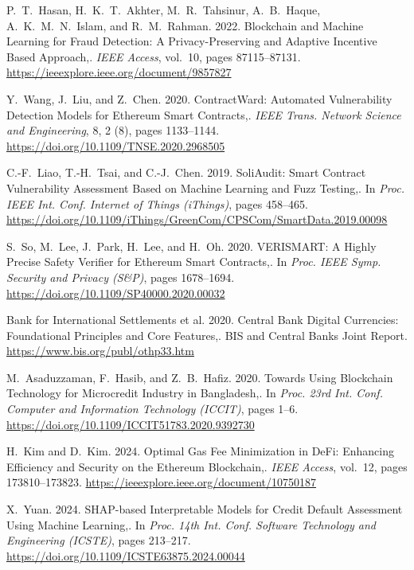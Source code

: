 {\begin{enumerate}[label={[\arabic*]}]
\item P.~T.~Hasan, H.~K.~T.~Akhter, M.~R.~Tahsinur, A.~B.~Haque, A.~K.~M.~N.~Islam, and R.~M.~Rahman. 2022. Blockchain and Machine Learning for Fraud Detection: A Privacy-Preserving and Adaptive Incentive Based Approach,. \emph{IEEE Access}, vol.~10, pages 87115--87131. \url{https://ieeexplore.ieee.org/document/9857827}

\item Y.~Wang, J.~Liu, and Z.~Chen. 2020. ContractWard: Automated Vulnerability Detection Models for Ethereum Smart Contracts,. \emph{IEEE Trans. Network Science and Engineering}, 8, 2 (8), pages 1133--1144. \url{https://doi.org/10.1109/TNSE.2020.2968505}

\item C.-F.~Liao, T.-H.~Tsai, and C.-J.~Chen. 2019. SoliAudit: Smart Contract Vulnerability Assessment Based on Machine Learning and Fuzz Testing,. In \emph{Proc. IEEE Int. Conf. Internet of Things (iThings)}, pages 458--465. \url{https://doi.org/10.1109/iThings/GreenCom/CPSCom/SmartData.2019.00098}

\item S.~So, M.~Lee, J.~Park, H.~Lee, and H.~Oh. 2020. VERISMART: A Highly Precise Safety Verifier for Ethereum Smart Contracts,. In \emph{Proc. IEEE Symp. Security and Privacy (S\&P)}, pages 1678--1694. \url{https://doi.org/10.1109/SP40000.2020.00032}

\item Bank for International Settlements et al. 2020. Central Bank Digital Currencies: Foundational Principles and Core Features,. BIS and Central Banks Joint Report. \url{https://www.bis.org/publ/othp33.htm}

\item M.~Asaduzzaman, F.~Hasib, and Z.~B.~Hafiz. 2020. Towards Using Blockchain Technology for Microcredit Industry in Bangladesh,. In \emph{Proc. 23rd Int. Conf. Computer and Information Technology (ICCIT)}, pages 1--6. \url{https://doi.org/10.1109/ICCIT51783.2020.9392730}

\item H.~Kim and D.~Kim. 2024. Optimal Gas Fee Minimization in DeFi: Enhancing Efficiency and Security on the Ethereum Blockchain,. \emph{IEEE Access}, vol.~12, pages 173810--173823. \url{https://ieeexplore.ieee.org/document/10750187}

\item X.~Yuan. 2024. SHAP-based Interpretable Models for Credit Default Assessment Using Machine Learning,. In \emph{Proc. 14th Int. Conf. Software Technology and Engineering (ICSTE)}, pages 213--217. \url{https://doi.org/10.1109/ICSTE63875.2024.00044}


\end{enumerate}}
